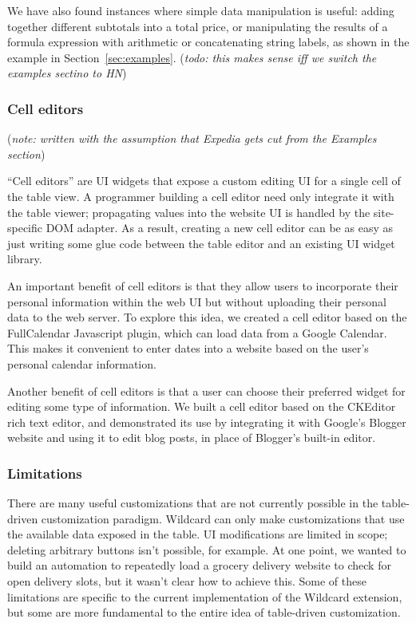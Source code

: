 \documentclass[sigplan,10pt,anonymous,review]{acmart}
\begin{document}
We have also found instances where simple data manipulation is useful:
adding together different subtotals into a total price, or manipulating
the results of a formula expression with arithmetic or concatenating
string labels, as shown in the example in Section~\ref{sec:examples}.
(\emph{todo: this makes sense iff we switch the examples sectino to HN})

\hypertarget{cell-editors}{%
\subsubsection{Cell editors}\label{cell-editors}}

(\emph{note: written with the assumption that Expedia gets cut from the
Examples section})

``Cell editors'' are UI widgets that expose a custom editing UI for a
single cell of the table view. A programmer building a cell editor need
only integrate it with the table viewer; propagating values into the
website UI is handled by the site-specific DOM adapter. As a result,
creating a new cell editor can be as easy as just writing some glue code
between the table editor and an existing UI widget library.

An important benefit of cell editors is that they allow users to
incorporate their personal information within the web UI but without
uploading their personal data to the web server. To explore this idea,
we created a cell editor based on the FullCalendar Javascript plugin,
which can load data from a Google Calendar. This makes it convenient to
enter dates into a website based on the user's personal calendar
information.

Another benefit of cell editors is that a user can choose their
preferred widget for editing some type of information. We built a cell
editor based on the CKEditor rich text editor, and demonstrated its use
by integrating it with Google's Blogger website and using it to edit
blog posts, in place of Blogger's built-in editor.

\hypertarget{limitations}{%
\subsubsection{Limitations}\label{limitations}}

There are many useful customizations that are not currently possible in
the table-driven customization paradigm. Wildcard can only make
customizations that use the available data exposed in the table. UI
modifications are limited in scope; deleting arbitrary buttons isn't
possible, for example. At one point, we wanted to build an automation to
repeatedly load a grocery delivery website to check for open delivery
slots, but it wasn't clear how to achieve this. Some of these
limitations are specific to the current implementation of the Wildcard
extension, but some are more fundamental to the entire idea of
table-driven customization.
\end{document}
